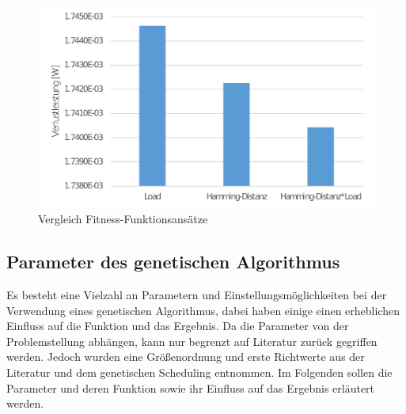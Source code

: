 \begin{figure}[H] 
	\centering
	\includegraphics[width=\textwidth]{fig/compare_genetic_modes.pdf}
	\caption{Vergleich Fitness-Funktionsansätze}
	\label{fig:compare_genetic_modes}
\end{figure}
 
\subsection{Parameter des genetischen Algorithmus}
\label{cap:parameter}
Es besteht eine Vielzahl an Parametern und Einstellungsmöglichkeiten bei der Verwendung eines genetischen Algorithmus, dabei haben einige einen erheblichen Einfluss auf die Funktion und das Ergebnis. Da die Parameter von der Problemstellung abhängen, kann nur begrenzt auf Literatur zurück gegriffen werden. Jedoch wurden eine Größenordnung und erste Richtwerte aus der Literatur \cite{grefenstette1986optimization} und dem genetischen Scheduling entnommen. Im Folgenden sollen die Parameter und deren Funktion sowie ihr Einfluss auf das Ergebnis erläutert werden.

